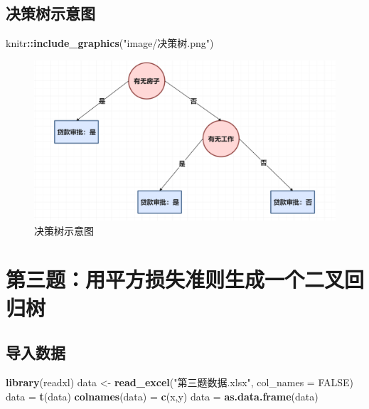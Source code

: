 \documentclass[
]{ctexart}
\newenvironment{Shaded}{\begin{snugshade}}{\end{snugshade}}
\newcommand{\AttributeTok}[1]{\textcolor[rgb]{0.13,0.29,0.53}{#1}}
\newcommand{\ConstantTok}[1]{\textcolor[rgb]{0.56,0.35,0.01}{#1}}
\newcommand{\FunctionTok}[1]{\textcolor[rgb]{0.13,0.29,0.53}{\textbf{#1}}}
\newcommand{\NormalTok}[1]{#1}
\newcommand{\OtherTok}[1]{\textcolor[rgb]{0.56,0.35,0.01}{#1}}
\newcommand{\SpecialCharTok}[1]{\textcolor[rgb]{0.81,0.36,0.00}{\textbf{#1}}}
\newcommand{\StringTok}[1]{\textcolor[rgb]{0.31,0.60,0.02}{#1}}
\begin{document}
\hypertarget{ux51b3ux7b56ux6811ux793aux610fux56fe}{%
\subsection{决策树示意图}\label{ux51b3ux7b56ux6811ux793aux610fux56fe}}

\begin{Shaded}
\begin{Highlighting}[]
\NormalTok{knitr}\SpecialCharTok{::}\FunctionTok{include\_graphics}\NormalTok{(}\StringTok{"image/决策树.png"}\NormalTok{)}
\end{Highlighting}
\end{Shaded}

\begin{figure}

{\centering \includegraphics[width=0.35\linewidth]{image/决策树} 

}

\caption{决策树示意图}\label{fig:unnamed-chunk-17}
\end{figure}

\hypertarget{ux7b2cux4e09ux9898ux7528ux5e73ux65b9ux635fux5931ux51c6ux5219ux751fux6210ux4e00ux4e2aux4e8cux53c9ux56deux5f52ux6811}{%
\section{第三题：用平方损失准则生成一个二叉回归树}\label{ux7b2cux4e09ux9898ux7528ux5e73ux65b9ux635fux5931ux51c6ux5219ux751fux6210ux4e00ux4e2aux4e8cux53c9ux56deux5f52ux6811}}

\hypertarget{ux5bfcux5165ux6570ux636e-1}{%
\subsection{导入数据}\label{ux5bfcux5165ux6570ux636e-1}}

\begin{Shaded}
\begin{Highlighting}[]
\FunctionTok{library}\NormalTok{(readxl)}
\NormalTok{data }\OtherTok{\textless{}{-}} \FunctionTok{read\_excel}\NormalTok{(}\StringTok{"第三题数据.xlsx"}\NormalTok{, }\AttributeTok{col\_names =} \ConstantTok{FALSE}\NormalTok{)}
\NormalTok{data }\OtherTok{=} \FunctionTok{t}\NormalTok{(data)}
\FunctionTok{colnames}\NormalTok{(data) }\OtherTok{=} \FunctionTok{c}\NormalTok{(}\StringTok{\textquotesingle{}x\textquotesingle{}}\NormalTok{,}\StringTok{\textquotesingle{}y\textquotesingle{}}\NormalTok{)}
\NormalTok{data }\OtherTok{=} \FunctionTok{as.data.frame}\NormalTok{(data)}
\end{Highlighting}
\end{Shaded}
\end{document}
